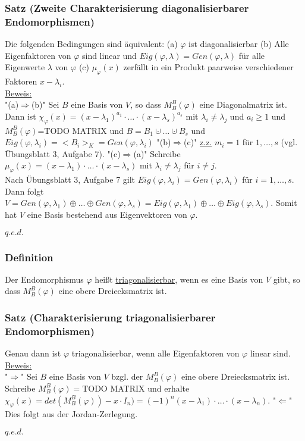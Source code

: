 \documentclass[a4paper]{article}
\newcommand{\ul}{\underline}
\renewcommand{\proof}{\ul{Beweis:}\\}
\renewcommand{\qed}{\begin{flushright}
\ul{\(q.e.d.\)}
\end{flushright}}
\let\phi\varphi
\begin{document}
\subsubsection{Satz (Zweite Charakterisierung diagonalisierbarer Endomorphismen)}
Die folgenden Bedingungen sind äquivalent:
(a) \(\phi\) ist diagonalisierbar
(b) Alle Eigenfaktoren von \(\phi\) sind linear und \(Eig(\phi,\lambda)=Gen(\phi,\lambda)\) für alle Eigenwerte \(\lambda\) von \(\phi\)
(c) \(\mu_\phi(x)\) zerfällt in ein Produkt paarweise verschiedener Faktoren \(x-\lambda_i\).\\
\proof
"(a)\(\Rightarrow\)(b)" Sei \(B\) eine Basis von \(V\), so dass \(M_B^B(\phi)\) eine Diagonalmatrix ist. Dann ist \(\chi_\phi(x)=(x-\lambda_1)^{a_1}\cdot\dots\cdot(x-\lambda_s)^{a_s}\) mit \(\lambda_i\neq\lambda_j\) und \(a_i\geq 1\) und \(M_B^B(\phi)\)=TODO MATRIX und \(B=B_1\cupdot\dots\cupdot B_s\) und \(Eig(\phi,\lambda_i)=<B_i>_K=Gen(\phi,\lambda_i)\)
"(b)\(\Rightarrow\)(c)" \ul{z.z.} \(m_i=1\) für \(1,\dots,s\) (vgl. Übungsblatt 3, Aufgabe 7).
"(c)\(\Rightarrow\)(a)" Schreibe \(\mu_\phi(x)=(x-\lambda_1)\cdot\dots\cdot(x-\lambda_s)\) mit \(\lambda_i\neq\lambda_j\) für \(i\neq j\).\\
Nach Übungsblatt 3, Aufgabe 7 gilt \(Eig(\phi,\lambda_i)=Gen(\phi,\lambda_i)\) für \(i=1,\dots,s\).\\
Dann folgt \(V=Gen(\phi,\lambda_1)\oplus\dots\oplus Gen(\phi,\lambda_s)=Eig(\phi,\lambda_1)\oplus\dots\oplus Eig(\phi,\lambda_s)\). Somit hat \(V\) eine Basis bestehend aus Eigenvektoren von \(\phi\).
\qed
\subsubsection{Definition}
Der Endomorphismus \(\phi\) heißt \ul{triagonalisierbar}, wenn es eine Basis von \(V\) gibt, so dass \(M_B^B(\phi)\) eine obere Dreiecksmatrix ist.
\subsubsection{Satz (Charakterisierung triagonalisierbarer Endomorphismen)}
Genau dann ist \(\phi\) triagonalisierbar, wenn alle Eigenfaktoren von \(\phi\) linear sind.\\
\proof
"\(\Rightarrow\)" Sei \(B\) eine Basis von \(V\) bzgl. der \(M_B^B(\phi)\) eine obere Dreiecksmatrix ist. Schreibe \(M_B^B(\phi)=\)TODO MATRIX und erhalte \(\chi_\phi(x)=det(M_B^B(\phi))-x\cdot I_n)=(-1)^n(x-\lambda_1)\cdot\dots\cdot (x-\lambda_n)\).
"\(\Leftarrow\)" Dies folgt aus der Jordan-Zerlegung.
\qed
\end{document}
